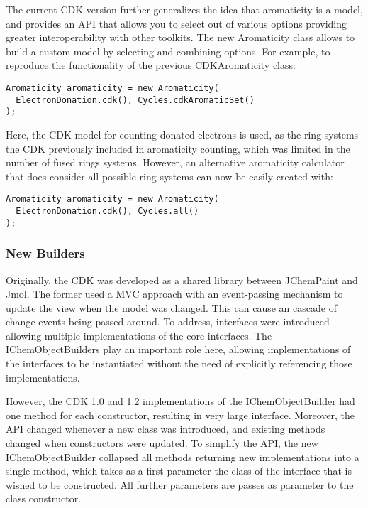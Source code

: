 \documentclass[10pt]{bmcart}
\begin{document}
  The current CDK version further generalizes the idea that aromaticity is a
  model, and provides an API that allows you to select out of various options
  providing greater interoperability with other toolkits. The new
  Aromaticity class allows to build a custom model by selecting and combining
  options. For example, to reproduce the functionality of the previous
  CDKAromaticity class:

\begin{verbatim}
Aromaticity aromaticity = new Aromaticity(
  ElectronDonation.cdk(), Cycles.cdkAromaticSet()
);
\end{verbatim}

Here, the CDK model for counting donated electrons is used, as the ring systems
the CDK previously included in aromaticity counting, which was limited in the 
number of fused rings systems. However, an alternative aromaticity calculator
that does consider all possible ring systems can now be easily created with:

\begin{verbatim}
Aromaticity aromaticity = new Aromaticity(
  ElectronDonation.cdk(), Cycles.all()
);
\end{verbatim}

  \subsubsection*{New Builders}

Originally, the CDK was developed as a shared library between JChemPaint and Jmol. The former
used a MVC approach with an event-passing mechanism to update the view when the model was
changed. This can cause an cascade of change events being passed around. To address,
interfaces were introduced allowing multiple implementations of the core interfaces.
The IChemObjectBuilders play an important role here, allowing implementations of the
interfaces to be instantiated without the need of explicitly referencing those implementations.

However, the CDK 1.0 and 1.2 implementations of the IChemObjectBuilder had one method for
each constructor, resulting in very large interface. Moreover, the API changed whenever
a new class was introduced, and existing methods changed when constructors were updated.
To simplify the API, the new IChemObjectBuilder collapsed all methods returning new
implementations into a single method, which takes as a first parameter the class of the
interface that is wished to be constructed. All further parameters are passes as
parameter to the class constructor.
\end{document}
